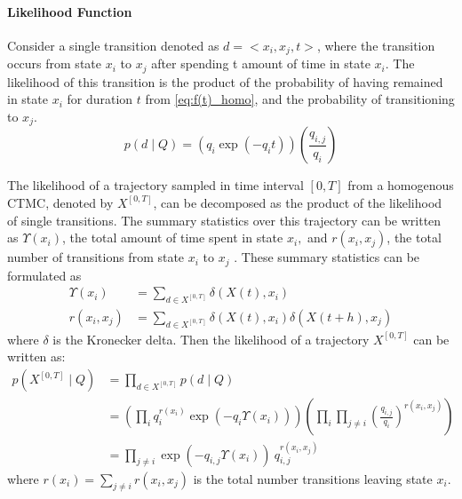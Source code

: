 \paragraph*{Likelihood Function}
\label{sec:llh_of_homo}
Consider a single transition denoted as $ d = <x_{i},x_{j},t> $, where the transition occurs from state $ x_{i} $ to $ x_{j} $ after spending t amount of time in state $ x_{i} $. The likelihood of this transition is the product of the probability of having remained in state $ x_{i} $ for duration $ t $ from \autoref{eq:f(t)_homo}, and the probability of transitioning to $ x_{j} $.
\begin{equation}
p(d  \mid Q) = \left( q_{i}\exp(-q_{i}t) \right) \left( \frac{q_{i,j}}{q_{i}} \right)
\end{equation}\par
The likelihood of a trajectory sampled in time interval $ [0, T] $ from a homogenous CTMC, denoted by $ X^{[0,T]} $, can be decomposed as the product of the likelihood of single transitions. The summary statistics over this trajectory can be written as $ \Upsilon(x_{i}) $, the total amount of time spent in state $ x_{i}, $ and  $ r(x_{i}, x_{j}) $, the total number of transitions from state $ x_{i} $ to $ x_{j} $ \cite{Nodelman2003}. These summary statistics can be formulated as
\begin{align}
\Upsilon(x_i) &= \sum_{d \in X^{[0,T]}} \delta(X(t), x_i) \label{eq:sum_stat_ups}\\
r(x_i,x_j) & = \sum_{d \in X^{[0,T]}} \delta(X(t), x_i) \delta(X(t+h), x_j) \label{eq:sum_stat_r}
\end{align}
where $ \delta $ is the Kronecker delta.
Then the likelihood of a trajectory $  X^{[0,T]} $ can be written as:
\begin{align}
p(X^{[0,T]}  \mid Q) &=  \prod_{d \in X^{[0,T]}} p(d \mid Q) \nonumber\\&=\left(\prod_{ i} q_{i}^{r(x_{i})} \exp \left(-q_{i} \Upsilon(x_{i})\right)\right)\left(\prod_{ i} \prod_{ j \neq i} \left(\frac{q_{i,j}}{q_{i}}\right)^{r(x_{i}, x_{j})}\right) \nonumber\\ & = \prod_{j \neq i}  \exp(-q_{i,j}\Upsilon(x_{i}))\ q_{i,j}^{r(x_{i},x_{j})}
\label{eq:lh_traj_homo}
\end{align}
where $ r(x_{i}) = \sum_{j \neq i} r(x_{i}, x_{j}) $ is the total number transitions leaving state $ x_{i} $.


